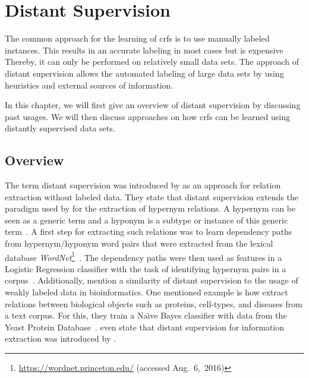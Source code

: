 \chapter{Distant Supervision}\label{cha:distant-supervision}

The common approach for the learning of \glspl{crf} is to use manually labeled instances.
This results in an accurate labeling in most cases but is expensive
Thereby, it can only be performed on relatively small data sets.
The approach of \gls{distant supervision} allows the automated labeling of large data sets by using heuristics and external sources of information.

In this chapter, we will first give an overview of \gls{distant supervision} by discussing past usages.
We will then discuss approaches on how \glspl{crf} can be learned using distantly supervised data sets.

\section{Overview}\label{sec:overview}

The term \gls{distant supervision} was introduced by \citet{mintz2009distant} as an approach for relation extraction without labeled data.
They state that \gls{distant supervision} extends the paradigm used by \citet{snow2005learning} for the extraction of hypernym relations.
A hypernym can be seen as a generic term and a hyponym is a subtype or instance of this generic term~\citep{snow2005learning}.
A first step for extracting such relations was to learn dependency paths from hypernym/hyponym word pairs that were extracted from the lexical database \textit{WordNet}\footnote{\url{https://wordnet.princeton.edu/} (accessed Aug.~6,~2016)}~\citep{snow2005learning}.
The dependency paths were then used as features in a Logistic Regression classifier with the task of identifying hypernym pairs in a corpus~\citep{snow2005learning}.
Additionally, \citet{mintz2009distant} mention a similarity of \gls{distant supervision} to the usage of weakly labeled data in bioinformatics.
One mentioned example is how \citet{craven1999constructing} extract relations between biological objects such as proteins, cell-types, and diseases from a text corpus.
For this, they train a Na\"{\i}ve Bayes classifier with data from the Yeast Protein Database~\citep{payne1997yeast}.
\citet{surdeanu2012multi} even state that distant supervision for information extraction was introduced by \citet{craven1999constructing}.

